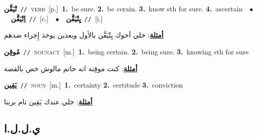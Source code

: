 \documentclass[10pt,a4paper,twoside]{article} %
\begin{document}
\begin{multicols}{2}
{\setlength\topsep{0pt}\textbf{\foreignlanguage{arabic}{تْيَقَّن}}\ {\color{gray}\texttt{//}\color{black}}\ \textsc{verb}\ [p.]\ \textbf{1.}~be sure.  \textbf{2.}~be cerain.  \textbf{3.}~know sth for sure.  \textbf{4.}~ascertain\ \ $\bullet$\ \ \setlength\topsep{0pt}\textbf{\foreignlanguage{arabic}{اِتْيَقَّن}}\ {\color{gray}\texttt{//}\color{black}}\ [c.]\ \ $\bullet$\ \ \setlength\topsep{0pt}\textbf{\foreignlanguage{arabic}{يِتْيَقَّن}}\ {\color{gray}\texttt{//}\color{black}}\ [i.]\  \begin{flushright}\color{gray}\foreignlanguage{arabic}{\textbf{\underline{\foreignlanguage{arabic}{أمثلة}}}: خلي أخوك يِتْيَقَّن بالأول وبعدين يوخذ إِجراء ضدهم}\end{flushright}\color{black}} \vspace{2mm}

{\setlength\topsep{0pt}\textbf{\foreignlanguage{arabic}{مُوقِن}}\ {\color{gray}\texttt{//}\color{black}}\ \textsc{noun\textunderscore act}\ [m.]\ \textbf{1.}~being certain.  \textbf{2.}~being sure.  \textbf{3.}~knowing sth for sure\  \begin{flushright}\color{gray}\foreignlanguage{arabic}{\textbf{\underline{\foreignlanguage{arabic}{أمثلة}}}: كنت موقِنة انه حاتم مالوش خص بالقصة}\end{flushright}\color{black}} \vspace{2mm}

{\setlength\topsep{0pt}\textbf{\foreignlanguage{arabic}{يَقِين}}\ {\color{gray}\texttt{//}\color{black}}\ \textsc{noun}\ [m.]\ \textbf{1.}~certainty  \textbf{2.}~certitude  \textbf{3.}~conviction\  \begin{flushright}\color{gray}\foreignlanguage{arabic}{\textbf{\underline{\foreignlanguage{arabic}{أمثلة}}}: خلي عندك يَقِين تام بربنا}\end{flushright}\color{black}} \vspace{2mm}

\vspace{-3mm}
\subsection*{\color{blue}\foreignlanguage{arabic}{ي.ل.ل.ا}\color{blue}{ (ntws)}} 


\end{multicols}
\end{document}
